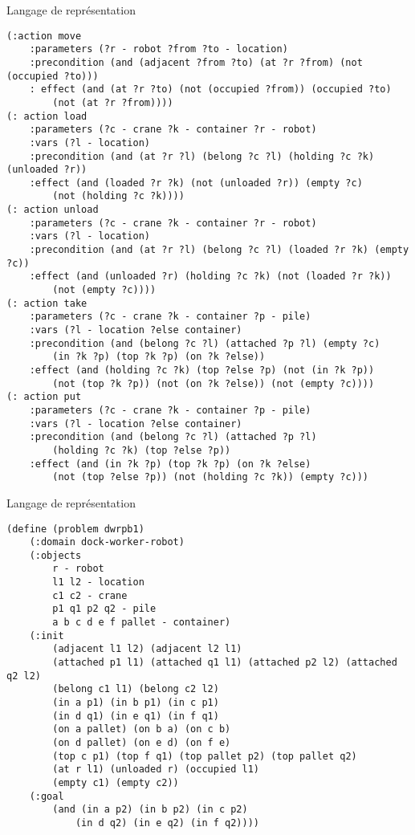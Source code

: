 \documentclass[compress]{beamer}
\begin{document}
\begin{frame}[containsverbatim]{Langage de représentation}
\begin{lstlisting}
(:action move
	:parameters (?r - robot ?from ?to - location)
	:precondition (and (adjacent ?from ?to) (at ?r ?from) (not (occupied ?to)))
	: effect (and (at ?r ?to) (not (occupied ?from)) (occupied ?to)
		(not (at ?r ?from))))
(: action load
	:parameters (?c - crane ?k - container ?r - robot)
	:vars (?l - location)
	:precondition (and (at ?r ?l) (belong ?c ?l) (holding ?c ?k) (unloaded ?r))
	:effect (and (loaded ?r ?k) (not (unloaded ?r)) (empty ?c)
		(not (holding ?c ?k))))
(: action unload
	:parameters (?c - crane ?k - container ?r - robot)
	:vars (?l - location)
	:precondition (and (at ?r ?l) (belong ?c ?l) (loaded ?r ?k) (empty ?c))
	:effect (and (unloaded ?r) (holding ?c ?k) (not (loaded ?r ?k))
		(not (empty ?c))))
(: action take
	:parameters (?c - crane ?k - container ?p - pile)
	:vars (?l - location ?else container)
	:precondition (and (belong ?c ?l) (attached ?p ?l) (empty ?c)
		(in ?k ?p) (top ?k ?p) (on ?k ?else))
	:effect (and (holding ?c ?k) (top ?else ?p) (not (in ?k ?p))
		(not (top ?k ?p)) (not (on ?k ?else)) (not (empty ?c))))
(: action put
	:parameters (?c - crane ?k - container ?p - pile)
	:vars (?l - location ?else container)
	:precondition (and (belong ?c ?l) (attached ?p ?l)
		(holding ?c ?k) (top ?else ?p))
	:effect (and (in ?k ?p) (top ?k ?p) (on ?k ?else)
		(not (top ?else ?p)) (not (holding ?c ?k)) (empty ?c)))
\end{lstlisting}
\end{frame}

\begin{frame}[containsverbatim]{Langage de représentation}
\begin{lstlisting}
(define (problem dwrpb1)
	(:domain dock-worker-robot)
	(:objects
		r - robot
		l1 l2 - location
		c1 c2 - crane
		p1 q1 p2 q2 - pile
		a b c d e f pallet - container)
	(:init
		(adjacent l1 l2) (adjacent l2 l1)
		(attached p1 l1) (attached q1 l1) (attached p2 l2) (attached q2 l2)
		(belong c1 l1) (belong c2 l2)
		(in a p1) (in b p1) (in c p1)
		(in d q1) (in e q1) (in f q1)
		(on a pallet) (on b a) (on c b)
		(on d pallet) (on e d) (on f e)
		(top c p1) (top f q1) (top pallet p2) (top pallet q2)
		(at r l1) (unloaded r) (occupied l1)
		(empty c1) (empty c2))
	(:goal
		(and (in a p2) (in b p2) (in c p2)
			(in d q2) (in e q2) (in f q2))))
\end{lstlisting}
\end{frame}
\end{document}
